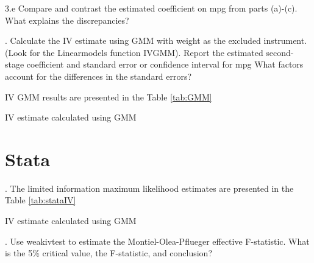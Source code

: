 \documentclass{article}
\begin{document}
\noindent 3.e Compare and contrast the estimated coefficient on mpg from parts (a)-(c). What explains the discrepancies?

. Calculate the IV estimate using GMM with weight as the excluded instrument. (Look for the Linearmodels function IVGMM). Report the estimated second-stage coefficient and standard error or confidence interval for mpg What factors account for the differences in the standard errors?

IV GMM results are presented in the Table \ref{tab:GMM}

\begin{table}[h]
    \centering
    
    \caption{IV estimate calculated using GMM}
    \label{tab:GMM}
\end{table}

\clearpage

\section{Stata}

. The limited information maximum likelihood estimates are presented in the Table \ref{tab:stataIV}

\begin{table}[h]
    \centering
    
    \caption{IV estimate calculated using GMM}
    \label{tab:stataIV}
\end{table}


. Use weakivtest to estimate the Montiel-Olea-Pflueger effective F-statistic. What is the 5\% critical value, the F-statistic, and conclusion?
\end{document}
